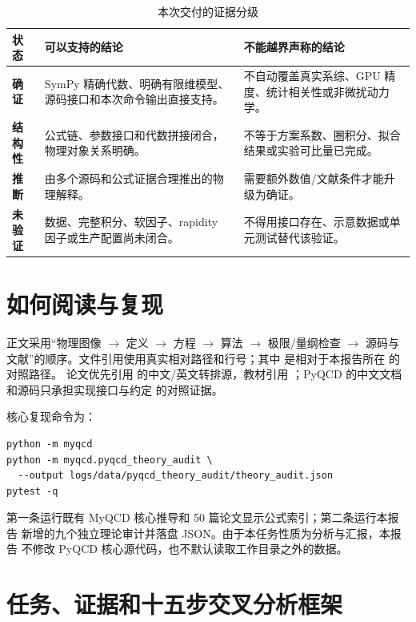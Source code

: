 \documentclass[UTF8,11pt,oneside]{ctexbook}
\newcommand{\verified}{\textcolor{evidence}{\textbf{确证}}}
\newcommand{\structural}{\textcolor{inferred}{\textbf{结构性}}}
\newcommand{\inferred}{\textcolor{inferred}{\textbf{推断}}}
\newcommand{\unverified}{\textcolor{warning}{\textbf{未验证}}}
\begin{document}
\begin{table}[htbp]
\centering
\caption{本次交付的证据分级}
\small
\begin{tabularx}{0.96\textwidth}{@{}P{2.4cm}Y Y@{}}
\toprule
状态 & 可以支持的结论 & 不能越界声称的结论\\
\midrule
\verified & SymPy 精确代数、明确有限维模型、源码接口和本次命令输出直接支持。
 & 不自动覆盖真实系综、GPU 精度、统计相关性或非微扰动力学。\\
\structural & 公式链、参数接口和代数拼接闭合，物理对象关系明确。
 & 不等于方案系数、圈积分、拟合结果或实验可比量已完成。\\
\inferred & 由多个源码和公式证据合理推出的物理解释。
 & 需要额外数值/文献条件才能升级为确证。\\
\unverified & 数据、完整积分、软因子、rapidity 因子或生产配置尚未闭合。
 & 不得用接口存在、示意数据或单元测试替代该验证。\\
\bottomrule
\end{tabularx}
\end{table}

\chapter*{如何阅读与复现}
正文采用“物理图像 $\to$ 定义 $\to$ 方程 $\to$ 算法 $\to$ 极限/量纲检查
$\to$ 源码与文献”的顺序。文件引用使用真实相对路径和行号；其中
 是相对于本报告所在  的对照路径。
论文优先引用  的中文/英文转排源，教材引用
；PyQCD 的中文文档和源码只承担实现接口与约定
的对照证据。

核心复现命令为：
\begin{lstlisting}
python -m myqcd
python -m myqcd.pyqcd_theory_audit \
  --output logs/data/pyqcd_theory_audit/theory_audit.json
pytest -q
\end{lstlisting}
第一条运行既有 MyQCD 核心推导和 50 篇论文显示公式索引；第二条运行本报告
新增的九个独立理论审计并落盘 JSON。由于本任务性质为分析与汇报，本报告
不修改 PyQCD 核心源代码，也不默认读取工作目录之外的数据。

\tableofcontents
\mainmatter

\chapter{任务、证据和十五步交叉分析框架}
\end{document}
